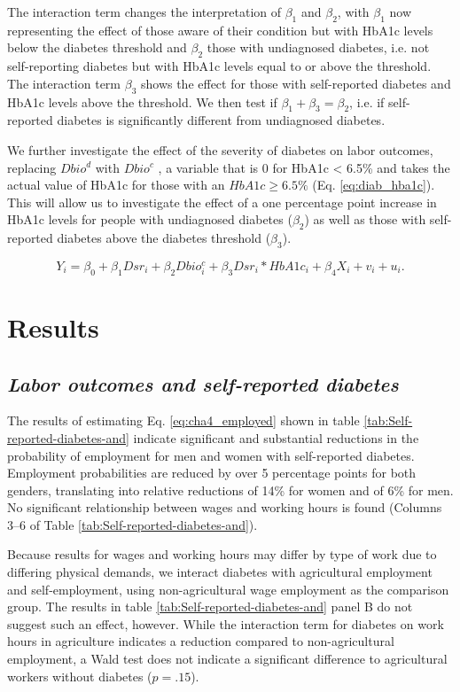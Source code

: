 \documentclass[12pt,english]{article}
\begin{document}
The interaction term changes the interpretation of $\beta_{1}$ and $\beta_{2}$, with $\beta_{1}$ now representing the effect of those aware of their condition but with \ac{HbA1c} levels below the diabetes threshold and $\beta_{2}$ those with undiagnosed diabetes, i.e. not self-reporting diabetes but with \ac{HbA1c} levels equal to or above the threshold. The interaction term $\beta_{3}$ shows the effect for those with self-reported diabetes and \ac{HbA1c} levels above the threshold. We then test if $\beta_{1} + \beta_{3} = \beta_{2}$, i.e. if self-reported diabetes is significantly different from undiagnosed diabetes.

We further investigate the effect of the severity of diabetes on labor outcomes, replacing $Dbio^{d}$ with $Dbio^{c}$ , a variable that is 0 for \ac{HbA1c} < 6.5\% and takes the actual value of \ac{HbA1c} for those with an $HbA1c \geq 6.5\%$ (Eq. \ref{eq:diab_hba1c}). This will allow us to investigate the effect of a one percentage point increase in \ac{HbA1c} levels for people with undiagnosed diabetes ($\beta_{2}$) as well as those with self-reported diabetes above the diabetes threshold ($\beta_{3}$).

\begin{equation}
Y_{i}=\beta_{0}+\beta_{1}Dsr_{i}+\beta_{2}Dbio^{c}_{i}+\beta_{3}Dsr_{i}*HbA1c_{i}+\beta_{4}X_{i}+v_{i}+u_{i}.\label{eq:diab_hba1c}
\end{equation}

\section{\label{sec:cha_4_results}Results}


\subsection{\textit{Labor outcomes and self-reported diabetes}}

The results of estimating Eq. \ref{eq:cha4_employed} shown in table \ref{tab:Self-reported-diabetes-and} indicate significant and substantial reductions in the probability of employment for men and women with self-reported diabetes. Employment probabilities are reduced by over 5 percentage points for both genders, translating into relative reductions of 14\% for women and of 6\% for men. No significant relationship between wages and working hours is found (Columns 3--6 of Table \ref{tab:Self-reported-diabetes-and}).

Because results for wages and working hours may differ by type of work due to differing physical demands, we interact diabetes with agricultural employment and self-employment, using non-agricultural wage employment as the comparison group. The results in table \ref{tab:Self-reported-diabetes-and} panel B do not suggest such an effect, however. While the interaction term for diabetes on work hours in agriculture indicates a reduction compared to non-agricultural employment, a Wald test does not indicate a significant difference to agricultural workers without diabetes  ($p = .15$).
\end{document}
